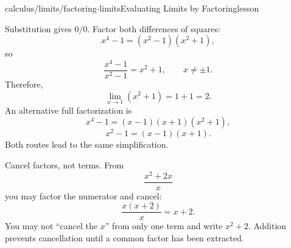 \begin{webpage}{calculus/limits/factoring-limits}{Evaluating Limits by Factoring}{lesson}
\begin{bgexample}[title={Exam-level: factor more than once}]
\begin{bgsolution}
Substitution gives \(0/0\). Factor both differences of squares:
\[
  x^4-1=(x^2-1)(x^2+1),
\]
so
\[
  \frac{x^4-1}{x^2-1}=x^2+1,\qquad x\ne\pm1.
\]
Therefore,
\[
  \lim_{x\to1}(x^2+1)=1+1=\boxed{2}.
\]
An alternative full factorization is
\[
  x^4-1=(x-1)(x+1)(x^2+1),
\]
\[
  x^2-1=(x-1)(x+1).
\]
Both routes lead to the same simplification.
\end{bgsolution}
\end{bgexample}

\begin{bgexamnote}
Cancel factors, not terms. From
\[
  \frac{x^2+2x}{x}
\]
you may factor the numerator and cancel:
\[
  \frac{x(x+2)}{x}=x+2.
\]
You may not ``cancel the \(x\)'' from only one term and write \(x^2+2\). Addition prevents cancellation until a common factor has been extracted.
\end{bgexamnote}
\end{webpage}


